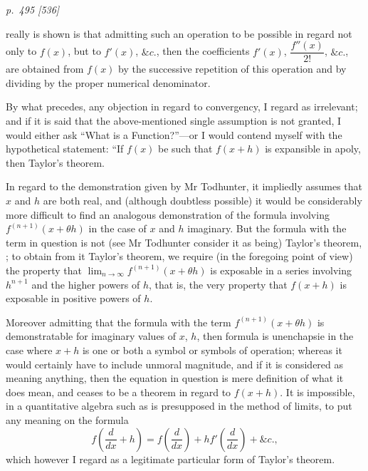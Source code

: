 \documentclass[11pt,a4paper]{article}
\theoremstyle{plain}
\theoremstyle{definition}
\begin{document}
\clearpage

\bigskip
\textit{p.~495 [536]}
\smallskip

\noindent
really is shown is that admitting such an operation to be possible in regard not only
to $f(x)$, but to $f'(x)$, $\&c.$, then the coefficients $f'(x)$, $\dfrac{f''(x)}{2!}$, $\&c.$, are obtained from $f(x)$
by the successive repetition of this operation and by dividing by the proper numerical
denominator.

By what precedes, any objection in regard to convergency, I regard as irrelevant;
and if it is said that the above-mentioned single assumption is not granted, I would
either ask ``What is a Function?''---or I would contend myself with the hypothetical
statement: ``If $f(x)$ be such that $f(x + h)$ is expansible in apoly, then Taylor's theorem.

In regard to the demonstration given by Mr Todhunter, it impliedly assumes that
$x$ and $h$ are both real, and (although doubtless possible) it would be considerably
more difficult to find an analogous demonstration of the formula involving $f^{(n+1)}(x + \theta h)$
in the case of $x$ and $h$ imaginary. But the formula with the term in question is
not (see Mr Todhunter consider it as being) Taylor's theorem, ; to obtain from it Taylor's
theorem, we require (in the foregoing point of view) the property that $\lim_{n \to \infty} f^{(n+1)}(x + \theta h)$ is
exposable in a series involving $h^{n+1}$ and the higher powers of $h$, that is, the very
property that $f(x + h)$ is exposable in positive powers of $h$.

Moreover admitting that the formula with the term $f^{(n+1)}(x + \theta h)$ is demonstratable
for imaginary values of $x$, $h$, then formula is unenchapsie in the case where $x + h$ is
one or both a symbol or symbols of operation; whereas it would certainly have to include
unmoral magnitude, and if it is considered as meaning anything, then the equation
in question is mere definition of what it does mean, and ceases to be a theorem
in regard to $f(x + h)$. It is impossible, in a quantitative algebra such as is presupposed
in the method of limits, to put any meaning on the formula
\[
f\left(\frac{d}{dx} + h\right) = f\left(\frac{d}{dx}\right) + hf'\left(\frac{d}{dx}\right) + \&c.,
\]
which however I regard as a legitimate particular form of Taylor's theorem.

\clearpage

\end{document}
